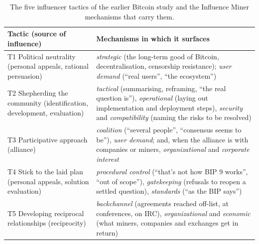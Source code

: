 \documentclass[sigconf,screen]{acmart}
\begin{document}
\begin{table}[t]
\caption{The five influencer tactics of the earlier Bitcoin study \cite{thapa2021bitcoin} and the Influence Miner mechanisms that carry them.}
\label{tab:icis}
\footnotesize
\begin{tabular}{p{}p{}}
\toprule
Tactic (source of influence) & Mechanisms in which it surfaces \\
\midrule
T1 Political neutrality (personal appeals, rational persuasion) & \emph{strategic} (the long-term good of Bitcoin, decentralisation, censorship resistance); \emph{user demand} (``real users'', ``the ecosystem'') \\
T2 Shepherding the community (identification, development, evaluation) & \emph{tactical} (summarising, reframing, ``the real question is''), \emph{operational} (laying out implementation and deployment steps), \emph{security} and \emph{compatibility} (naming the risks to be resolved) \\
T3 Participative approach (alliance) & \emph{coalition} (``several people'', ``consensus seems to be''), \emph{user demand}; and, when the alliance is with companies or miners, \emph{organizational} and \emph{corporate interest} \\
T4 Stick to the laid plan (personal appeals, solution evaluation) & \emph{procedural control} (``that's not how BIP 9 works'', ``out of scope''), \emph{gatekeeping} (refusals to reopen a settled question), \emph{standards} (``as the BIP says'') \\
T5 Developing reciprocal relationships (reciprocity) & \emph{backchannel} (agreements reached off-list, at conferences, on IRC), \emph{organizational} and \emph{economic} (what miners, companies and exchanges get in return) \\
\bottomrule
\end{tabular}
\end{table}
\end{document}
